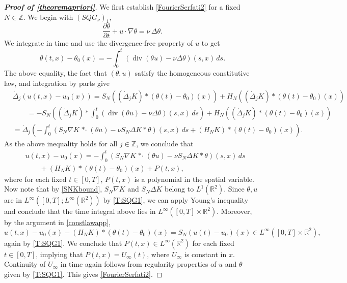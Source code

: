 \documentclass[11pt,reqno,xcolor=svgnames]{amsart}
\def\R{{\mathbb R}}
\def\Z{{\mathbb Z}}
\theoremstyle{plain}
\theoremstyle{definition}
\theoremstyle{plain}
\theoremstyle{remark}
\DeclareMathOperator{\dv}{div}
\newcommand{\stardot}{{\mathop{* \cdot}}}
\begin{document}
\begin{proof}[\textbf{Proof of \cref{theoremapriori}}] 
We first establish \eqref{FourierSerfati2} for a fixed $N \in \Z$.  We begin with $(SQG_{\nu})_1$,
\begin{equation}
\frac{\partial\theta}{\partial t}+u\cdot\nabla\theta 
=\nu\,\Delta\theta.
\end{equation}
We integrate in time and use the divergence-free property of $u$ to get 
$$\theta(t,x) - \theta_0(x) = -\int_0^t( \dv (\theta u) - \nu\Delta\theta)(s,x) \, ds.$$
The above equality, the fact that $(\theta,u)$ satisfy the homogeneous constitutive law, and integration by parts give
\begin{equation*}
\begin{split}
&\dot{\Delta}_j \left(u(t,x) - u_0(x)\right) = S_{N}\left((\dot{\Delta}_jK) \ast (\theta(t) - \theta_0)(x)\right) + H_N \left((\dot{\Delta}_jK) \ast (\theta(t) - \theta_0)(x)\right) \\
&\qquad = - S_{N}\left((\dot{\Delta}_jK) \ast \int_0^t(\dv (\theta u) -\nu\Delta\theta)(s,x)  \, ds \right)+ H_N \left((\dot{\Delta}_jK) \ast (\theta(t) - \theta_0)(x) \right)\\
& = \dot{\Delta}_j\left(-\int_0^t \left( S_{N}\nabla K \stardot (\theta u)  - \nu S_{N}\Delta K \ast \theta\right)(s,x) \, ds +  (H_NK) \ast (\theta(t) - \theta_0)(x) \right).
\end{split}
\end{equation*}
As the above inequality holds for all $j\in\Z$, we conclude that 
\begin{equation*}
\begin{split}
&u(t,x) - u_0(x) = -\int_0^t \left( S_{N}\nabla K \stardot (\theta u)  - \nu S_{N}\Delta K \ast \theta\right)(s,x) \, ds\\
&\qquad +  (H_NK) \ast (\theta(t) - \theta_0)(x) +P(t,x),
\end{split}
\end{equation*}
where for each fixed $t\in[0,T]$, $P(t,x)$ is a polynomial in the spatial variable.  Now note that by \cref{SNKbound}, $S_N\nabla K$ and $S_N\Delta K$ belong to $L^1(\R^2)$. Since $\theta, u$ are in $L^{\infty}([0,T]; L^{\infty}(\R^2))$ by \cref{T:SQG1}, we can apply Young's inequality and conclude that the time integral above lies in $L^{\infty}([0,T]\times\R^2)$.  Moreover, by the argument in \cref{constlawapp}, 
$$u(t,x) - u_0(x) -  (H_NK) \ast (\theta(t) - \theta_0)(x) = S_N (u(t) - u_0)(x)\in L^{\infty}([0,T]\times\R^2),$$
again by \cref{T:SQG1}.  We conclude that $P(t,x) \in L^{\infty}(\R^2)$ for each fixed $t\in [0,T]$, implying that $P(t,x) = U_{\infty}(t)$, where $U_{\infty}$ is constant in $x$.  Continuity of $U_{\infty}$ in time again follows from regularity properties of $u$ and $\theta$ given by \cref{T:SQG1}.  This gives \cref{FourierSerfati2}.


\end{proof}
\end{document}
